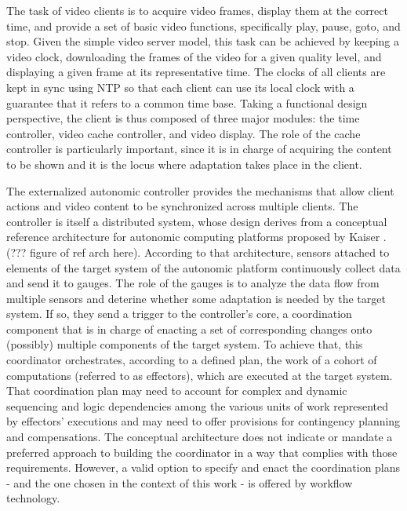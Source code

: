 \documentclass{sig-alternate}
\begin{document}
The task of video clients is to acquire video frames, display them at
the correct time, and provide a set of basic video functions,
specifically play, pause, goto, and stop.  Given the simple video
server model, this task can be achieved by keeping a video clock,
downloading the frames of the video for a given quality level, and
displaying a given frame at its representative time.  The clocks of
all clients are kept in sync using NTP \cite{NTP} so that each client
can use its local clock with a guarantee that it refers to a common
time base. Taking a functional design perspective, the client is thus
composed of three major modules: the time controller, video cache
controller, and video display. The role of the cache controller is
particularly important, since it is in charge of acquiring the content
to be shown and it is the locus where adaptation takes place in the
client.

The externalized autonomic controller provides the mechanisms that
allow client actions and video content to be synchronized across
multiple clients. The controller is itself a distributed system, whose
design derives from a conceptual reference architecture for autonomic
computing platforms proposed by Kaiser \cite{refarch}.  (??? figure of
ref arch here). According to that architecture, sensors attached to
elements of the target system of the autonomic platform continuously
collect data and send it to gauges.  The role of the gauges is to
analyze the data flow from multiple sensors and deterine whether some
adaptation is needed by the target system.  If so, they send a trigger
to the controller's core, a coordination component that is in charge
of enacting a set of corresponding changes onto (possibly) multiple
components of the target system.  To achieve that, this coordinator
orchestrates, according to a defined plan, the work of a cohort of
computations (referred to as effectors), which are executed at the
target system.  That coordination plan may need to account for complex
and dynamic sequencing and logic dependencies among the various units
of work represented by effectors' executions and may need to offer
provisions for contingency planning and compensations. The conceptual
architecture does not indicate or mandate a preferred approach to
building the coordinator in a way that complies with those
requirements.  However, a valid option to specify and enact the
coordination plans - and the one chosen in the context of this work -
is offered by workflow technology.
\end{document}
